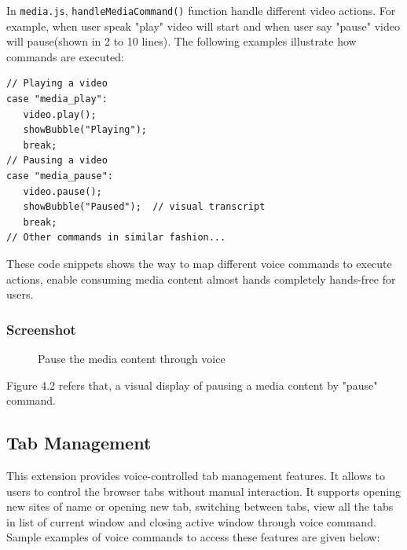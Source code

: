 In \texttt{media.js}, \texttt{handleMediaCommand()} function handle different video actions. For example, when user speak "play" video will start and when user say "pause" video will pause(shown in 2 to 10 lines). The following examples illustrate how commands are executed:

\begin{verbatim}
// Playing a video
case "media_play":
   video.play();
   showBubble("Playing");
   break;
// Pausing a video
case "media_pause":
   video.pause();
   showBubble("Paused");  // visual transcript
   break;
// Other commands in similar fashion...
\end{verbatim}

These code snippets shows the way to map different voice commands 
to execute actions, enable consuming media content almost hands completely hands-free for users.
\subsubsection*{Screenshot}
\begin{figure}[htbp] 
    \centering
    \caption{ Pause the media content through voice}
    \label{fig:pause_media}
\end{figure}

Figure 4.2 refers that, a visual display of pausing a media content by "pause" command.

\subsection{Tab Management}
This extension provides voice-controlled tab management features. It allows to users to control the browser tabs without manual interaction. It supports opening new sites of name or opening new tab, switching between tabs, view all the tabs in list of current window and closing active window through voice command. Sample examples of voice commands to access these features are given below:

